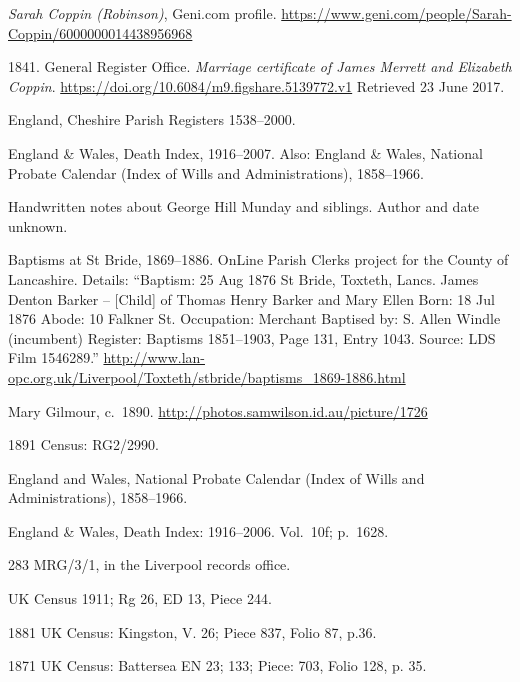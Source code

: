 \begin{thebibliography}{99}
\footnotesize

	\emph{Sarah Coppin (Robinson)}, Geni.com profile.
	\url{https://www.geni.com/people/Sarah-Coppin/6000000014438956968}

	1841. General Register Office. \emph{Marriage certificate of James Merrett and Elizabeth Coppin}.
	\url{https://doi.org/10.6084/m9.figshare.5139772.v1}
	Retrieved 23 June 2017.

	England, Cheshire Parish Registers 1538--2000.

	England \& Wales, Death Index, 1916--2007.
	Also: England \& Wales, National Probate Calendar (Index of Wills and Administrations), 1858--1966.

	Handwritten notes about George Hill Munday and siblings. Author and date unknown.

	Baptisms at St Bride, 1869--1886. OnLine Parish Clerks project for the County of Lancashire.
	Details: ``Baptism: 25 Aug 1876 St Bride, Toxteth, Lancs.
	James Denton Barker -- [Child] of Thomas Henry Barker and Mary Ellen
	Born: 18 Jul 1876
	Abode: 10 Falkner St.
	Occupation: Merchant
	Baptised by: S. Allen Windle (incumbent)
	Register: Baptisms 1851--1903, Page 131, Entry 1043.
	Source: LDS Film 1546289.''
	\url{http://www.lan-opc.org.uk/Liverpool/Toxteth/stbride/baptisms_1869-1886.html}

	Mary Gilmour, c.~1890.
	\url{http://photos.samwilson.id.au/picture/1726}

	1891 Census: RG2/2990.

	England and Wales, National Probate Calendar (Index of Wills and Administrations), 1858--1966.

	England \& Wales, Death Index: 1916--2006. Vol.~10f; p.~1628.

	283 MRG/3/1, in the Liverpool records office.

	UK Census 1911; Rg 26, ED 13, Piece 244.

	1881 UK Census: Kingston, V. 26; Piece 837, Folio 87, p.36.

	1871 UK Census: Battersea EN 23; 133; Piece: 703, Folio 128, p. 35.


\end{thebibliography}
